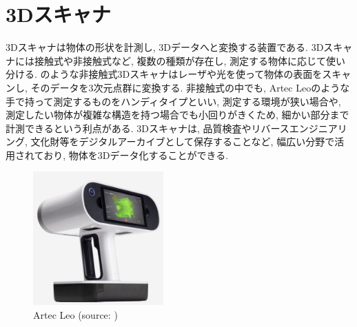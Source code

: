 \section{3Dスキャナ}
3Dスキャナは物体の形状を計測し, 3Dデータへと変換する装置である.
3Dスキャナには接触式や非接触式など, 複数の種類が存在し, 測定する物体に応じて使い分ける.
のような非接触式3Dスキャナはレーザや光を使って物体の表面をスキャンし, そのデータを3次元点群に変換する.
非接触式の中でも, Artec Leoのような手で持って測定するものをハンディタイプといい, 測定する環境が狭い場合や, 測定したい物体が複雑な構造を持つ場合でも小回りがきくため, 細かい部分まで計測できるという利点がある.
3Dスキャナは, 品質検査やリバースエンジニアリング, 文化財等をデジタルアーカイブとして保存することなど, 幅広い分野で活用されており, 物体を3Dデータ化することができる.

\begin{figure}[H]
     \centering
     \includegraphics[width=50mm]{images/png/artecleo.png}
     \caption[Artec Leo]{Artec Leo (source: \cite{artecleo})}
     \label{Fig:artecleo}
   \end{figure}